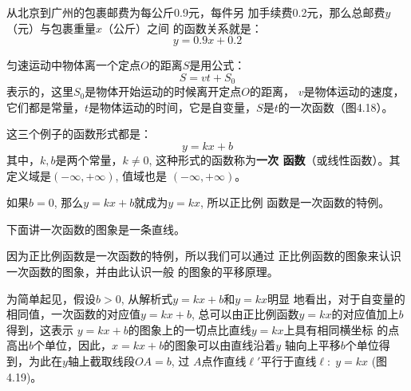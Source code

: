 \begin{example}
    从北京到广州的包裹邮费为每公斤0.9元，每件另
加手续费0.2元，那么总邮费$y$（元）与包裹重量$x$（公斤）之间
的函数关系就是：
\begin{equation}
  y=0.9x+0.2  
\end{equation}
\end{example}


\begin{example}
    匀速运动中物体离一个定点$O$的距离$S$是用公式：
\[S=vt+S_0\]
表示的，这里$S_0$是物体开始运动的时候离开定点$O$的距离，
$v$是物体运动的速度，它们都是常量，$t$是物体运动的时间，它是自变量，$S$是$t$的一次函数（图4.18）。
\begin{figure}[htp]
    \begin{center}
    \end{center}
    \caption{}
\end{figure}
\end{example}

这三个例子的函数形式都是：
\[y=kx+b\]
其中，$k,b$是两个常量，$k\ne 0$, 这种形式的函数称为\textbf{一次
函数}（或线性函数）。其定义域是$(-\infty,+\infty)$, 值域也是
$(-\infty,+\infty)$。

如果$b=0$, 那么$y=kx+b$就成为$y=kx$, 所以正比例
函数是一次函数的特例。

下面讲一次函数的图象是一条直线。

因为正比例函数是一次函数的特例，所以我们可以通过
正比例函数的图象来认识一次函数的图象，并由此认识一般
的图象的平移原理。

为简单起见，假设$b>0$, 从解析式$y=kx+b$和$y=kx$明显
地看出，对于自变量的相同值，一次函数的对应值$y=kx+b$,
总可以由正比例函数$y=kx$的对应值加上$b$得到，这表示
$y=kx+b$的图象上的一切点比直线$y=kx$上具有相同横坐标
的点高出$b$个单位，因此，$x=kx+b$的图象可以由直线沿着$y$
轴向上平移$b$个单位得到，为此在$y$轴上截取线段$OA=b$, 过
$A$点作直线$\ell'$平行于直线$\ell:\; y=kx$ (图4.19)。

